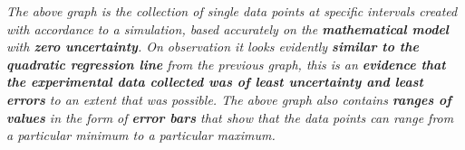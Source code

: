 \textit{The above graph is the collection of single data points at specific intervals created with accordance to a simulation, based accurately on the \textbf{mathematical model} with \textbf{zero uncertainty}. On observation it looks evidently \textbf{similar to the quadratic regression line} from the previous graph, this is an \textbf{evidence that the experimental data collected was of least uncertainty and least errors} to an extent that was possible. The above graph also contains \textbf{ranges of values }in the form of \textbf{error bars} that show that the data points can range from a particular minimum to a particular maximum.}


